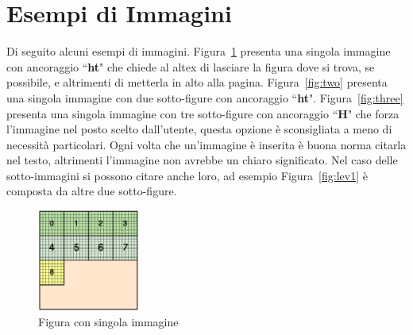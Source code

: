 \section{Esempi di Immagini}\label{sec:images}
Di seguito alcuni esempi di immagini.
Figura~\ref{fig:one} presenta una singola immagine con ancoraggio ``\textbf{ht}" che chiede al altex di lasciare la figura dove si trova, se possibile, e altrimenti di metterla in alto alla pagina.
Figura~\ref{fig:two} presenta una singola immagine con due sotto-figure con ancoraggio ``\textbf{ht}".
Figura~\ref{fig:three} presenta una singola immagine con tre sotto-figure con ancoraggio ``\textbf{H}" che forza l'immagine nel posto scelto dall'utente, questa opzione è sconsigliata a meno di necessità particolari.
Ogni volta che un'immagine è inserita è buona norma citarla nel testo, altrimenti l'immagine non avrebbe un chiaro significato.
Nel caso delle sotto-immagini si possono citare anche loro, ad esempio Figura~\ref{fig:lev1} è composta da altre due sotto-figure.
\begin{figure}[ht]
	\centering
	\includegraphics[width=0.3\textwidth]{Immagini/block_on_grid.png}
	\caption{Figura con singola immagine}
	\label{fig:one}
\end{figure}

